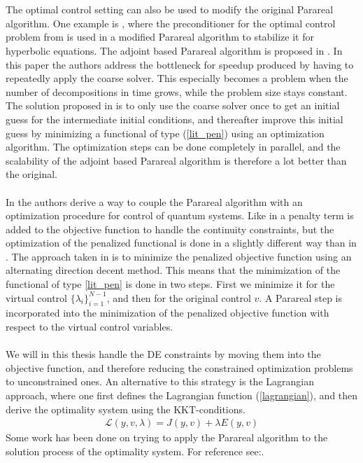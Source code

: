 \\
\\
The optimal control setting can also be used to modify the original Parareal algorithm. One example is \cite{chen2015adjoint}, where the preconditioner for the optimal control problem from \cite{maday2002parareal}  is used in a modified Parareal algorithm to stabilize it for hyperbolic equations. The adjoint based Parareal algorithm is proposed in \cite{rao2014adjoint}. In this paper the authors address the bottleneck for speedup produced by having to repeatedly apply the coarse solver. This especially becomes a problem when the number of decompositions in time grows, while the problem size stays constant. The solution proposed in \cite{rao2014adjoint} is to only use the coarse solver once to get an initial guess for the intermediate initial conditions, and thereafter improve this initial guess by minimizing a functional of type (\ref{lit_pen}) using an optimization algorithm. The optimization steps can be done completely in parallel, and the scalability of the adjoint based Parareal algorithm is therefore a lot better than the original.
\\
\\
In \cite{maday2003parallel,maday2007monotonic} the authors derive a way to couple the Parareal algorithm with an optimization procedure for control of quantum systems. Like in  \cite{maday2002parareal} a penalty term is added to the objective function to handle the continuity constraints, but the optimization of the penalized functional is done in a slightly different way than in \cite{maday2002parareal}. The approach taken in \cite{maday2007monotonic} is to minimize the penalized objective function using an alternating direction decent method. This means that the minimization of the functional of type \ref{lit_pen} is done in two steps. First we minimize it for the virtual control $\{\lambda_i\}_{i=1}^{N-1}$, and then for the original control $v$. A Parareal step is incorporated into the minimization of the penalized objective function with respect to the virtual control variables.
\\
\\
We will in this thesis handle the DE constraints by moving them into the objective function, and therefore reducing the constrained optimization problems to unconstrained ones. An alternative to this strategy is the Lagrangian approach, where one first defines the Lagrangian function (\ref{lagrangian}), and then derive the optimality system using the KKT-conditions. 
\begin{align}
\mathcal{L}(y,v,\lambda) = J(y,v) + \lambda E(y,v) \label{lagrangian}
\end{align}
Some work has been done on trying to apply the Parareal algorithm to the solution process of the optimality system. For reference see:\cite{ulbrich2015preconditioners, mathew2010analysis, carraro2014indirect, pearson2012regularization}.
